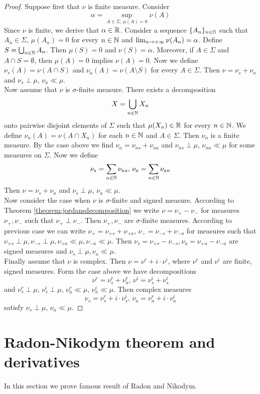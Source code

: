 \begin{proof}
Suppose first that $\nu$ is finite measure. Consider
$$\alpha = \sup_{A\in \Sigma,\,\mu(A)=0}\nu(A)$$
Since $\nu$ is finite, we derive that $\alpha \in {\mathbb R}$. Consider a sequence $\{A_n\}_{n\in {\mathbb N}}$ such that $A_n\in \Sigma$, $\mu(A_n)=0$ for every $n\in {\mathbb N}$ and $\lim_{n\rightarrow +\infty}\nu(A_n)=\alpha$. Define $S = \bigcup_{n\in {\mathbb N}}A_n$. Then $\mu(S) = 0$ and $\nu(S) = \alpha$. Moreover, if $A\in \Sigma$ and $A\cap S = \emptyset$, then $\mu(A) = 0$ implies $\nu(A) = 0$. Now we define $\nu_s(A) = \nu(A\cap S)$ and $\nu_a(A) = \nu(A\setminus S)$ for every $A\in \Sigma$. Then $\nu = \nu_s+\nu_a$ and $\nu_s \perp \mu$, $\nu_a \ll \mu$.\\
Now assume that $\nu$ is $\sigma$-finite measure. There exists a decomposition
$$X = \bigcup_{n\in {\mathbb N}}X_n$$
onto pairwise disjoint elements of $\Sigma$ such that $\mu(X_n)\in {\mathbb R}$ for every $n\in {\mathbb N}$. We define $\nu_n(A) = \nu(A\cap X_n)$ for each $n\in {\mathbb N}$ and $A\in \Sigma$. Then $\nu_n$ is a finite measure. By the case above we find $\nu_n = \nu_{ns}+ \nu_{na}$ and $\nu_{ns}\perp \mu$, $\nu_{na} \ll \mu$ for some measures on $\Sigma$. Now we define
$$\nu_s = \sum_{n\in {\mathbb N}}\nu_{ns},\,\nu_a=\sum_{n\in {\mathbb N}}\nu_{an}$$
Then $\nu = \nu_s+\nu_a$ and $\nu_s \perp \mu$, $\nu_a \ll \mu$.\\
Now consider the case when $\nu$ is $\sigma$-finite and signed measure. According to Theorem \ref{theorem:jordansdecomposition} we write $\nu = \nu_+-\nu_-$ for measures $\nu_+,\nu_-$ such that $\nu_+\perp \nu_-$. Then $\nu_+,\nu_-$ are $\sigma$-finite measures. According to previous case we can write $\nu_+ = \nu_{+s}+\nu_{+a}$, $\nu_- = \nu_{-s} + \nu_{-a}$ for measures such that $\nu_{+s} \perp \mu,\nu_{-s} \perp \mu,\nu_{+a}\ll \mu,\nu_{-a}\ll\mu$. Then $\nu_s = \nu_{+s} - \nu_{-s}, \nu_a=\nu_{+a}-\nu_{-a}$ are signed measures and $\nu_s \perp \mu, \nu_a\ll\mu$.\\
Finally assume that $\nu$ is complex. Then $\nu = \nu^r + i\cdot \nu^i$, where $\nu^r$ and $\nu^i$ are finite, signed measures. Form the case above we have decompositions
$$\nu^r = \nu^r_s+\nu^r_a,\,\nu^i=\nu^i_s+\nu^i_s$$
and $\nu^r_s \perp \mu$, $\nu^i_s \perp \mu$, $\nu^r_a \ll\mu$, $\nu^i_a \ll \mu$. Then complex measures 
$$\nu_s = \nu^r_s+i\cdot \nu^i_s,\,\nu_a = \nu^r_a+i\cdot \nu^i_a$$
satisfy $\nu_s \perp \mu$, $\nu_a \ll \mu$.
\end{proof}

\section{Radon-Nikodym theorem and derivatives}
\noindent
In this section we prove famous result of Radon and Nikodym.

